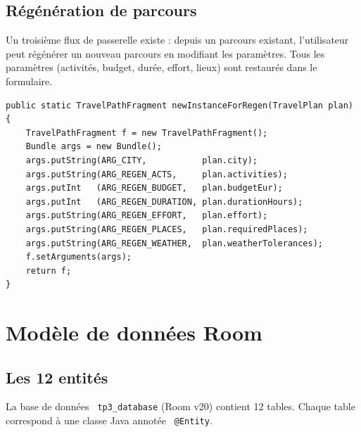 \documentclass[a4paper,12pt,openany]{report}
\newcommand{\ic}[1]{\texttt{\small\colorbox{lightbg}{\color{navy!90} #1}}}
\begin{document}
\section{Régénération de parcours}

Un troisième flux de passerelle existe : depuis un parcours existant, l'utilisateur
peut régénérer un nouveau parcours en modifiant les paramètres. Tous les paramètres
(activités, budget, durée, effort, lieux) sont restaurés dans le formulaire.

\begin{lstlisting}
public static TravelPathFragment newInstanceForRegen(TravelPlan plan) {
    TravelPathFragment f = new TravelPathFragment();
    Bundle args = new Bundle();
    args.putString(ARG_CITY,           plan.city);
    args.putString(ARG_REGEN_ACTS,     plan.activities);
    args.putInt   (ARG_REGEN_BUDGET,   plan.budgetEur);
    args.putInt   (ARG_REGEN_DURATION, plan.durationHours);
    args.putString(ARG_REGEN_EFFORT,   plan.effort);
    args.putString(ARG_REGEN_PLACES,   plan.requiredPlaces);
    args.putString(ARG_REGEN_WEATHER,  plan.weatherTolerances);
    f.setArguments(args);
    return f;
}
\end{lstlisting}


\chapter{Modèle de données Room}

\section{Les 12 entités}

La base de données \ic{tp3\_database} (Room v20) contient 12 tables. Chaque table
correspond à une classe Java annotée \ic{@Entity}.
\end{document}
